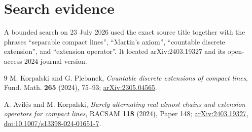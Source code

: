 \documentclass[11pt]{article}
\begin{document}
\section*{Search evidence}

A bounded search on 23 July 2026 used the exact source title together with
the phrases ``separable compact lines'', ``Martin's axiom'', ``countable
discrete extension'', and ``extension operator''.  It located
arXiv:2403.19327 and its open-access 2024 journal version.

\begin{thebibliography}{9}
M. Korpalski and G. Plebanek,
\emph{Countable discrete extensions of compact lines},
Fund. Math. \textbf{265} (2024), 75--93;
\href{https://arxiv.org/abs/2305.04565}{arXiv:2305.04565}.

A. Avil\'es and M. Korpalski,
\emph{Barely alternating real almost chains and extension operators for
compact lines},
RACSAM \textbf{118} (2024), Paper 148;
\href{https://arxiv.org/abs/2403.19327}{arXiv:2403.19327},
\href{https://doi.org/10.1007/s13398-024-01651-7}{doi:10.1007/s13398-024-01651-7}.
\end{thebibliography}
\end{document}
